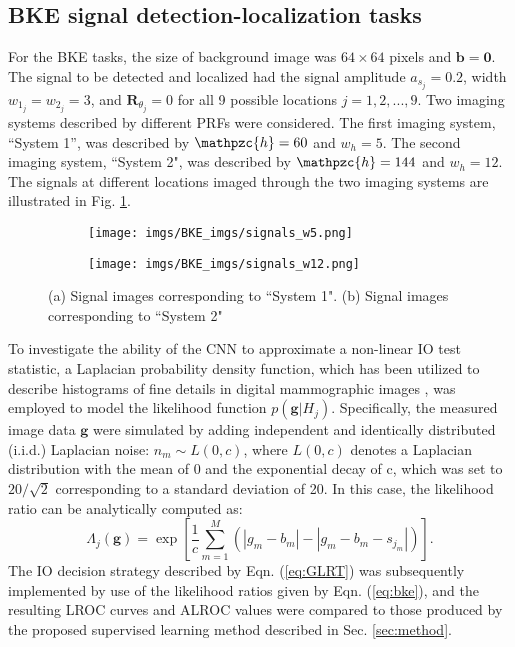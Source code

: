 \documentclass[journal]{IEEEtran}
\renewcommand{\vec}[1]{\mathbf{#1}}
\begin{document}
\subsection{BKE signal detection-localization tasks}
\vspace{0.05cm}
For the BKE tasks, the size of background image was $64\times 64$ pixels and $\vec{b} = \vec{0}$.
The signal to be detected and localized had the signal amplitude $a_{s_j} = 0.2$, width $w_{1_j} = w_{2_j} = 3$, and $\vec{R}_{\theta_j} = 0$ for all 9 possible locations $j=1,2,...,9$.
Two imaging systems described by different PRFs  were considered.
The first imaging system, ``System 1'', was described by $\mathpzc{h}=60$ and $w_h=5$.
The second imaging system, ``System 2", was described by $\mathpzc{h}=144$ and $w_h=12$.
The signals at different locations imaged through the two imaging systems are illustrated in Fig. \ref{sig_imgs}.
\begin{figure}[ht]
\centering
\begin{subfigure}[b]{0.24\textwidth}
   \centering
 \texttt{[image: imgs/BKE\_imgs/signals\_w5.png]}
 \caption{}
 \end{subfigure}
 \begin{subfigure}[b]{0.24\textwidth}
  \centering
 \texttt{[image: imgs/BKE\_imgs/signals\_w12.png]}
  \caption{}
 \end{subfigure}
 \caption{(a) Signal images corresponding to ``System 1".  (b) Signal images corresponding to ``System 2"}
 \label{sig_imgs}
\end{figure}

To investigate the ability of the CNN to approximate a non-linear IO test statistic,
a Laplacian probability density function,
which has been utilized  
to describe histograms of 
fine details in 
digital mammographic images \cite{heine1999multiresolution, clarkson2000approximations}, 
was employed to model the likelihood function $p(\vec{g}|H_j)$.
Specifically, the measured image data $\vec{g}$ were simulated by adding independent and identically distributed (i.i.d.) Laplacian noise\cite{clarkson2000approximations}:
$n_m\sim L(0,c)$, where $L(0,c)$ denotes a Laplacian distribution with the mean of 0 and the exponential decay of c, which was set to $20/\sqrt{2}$ corresponding to a standard deviation of 20.
In this case, the likelihood ratio can be analytically computed as\cite{clarkson2000approximations}:
\begin{equation}\label{eq:bke}
\Lambda_j(\vec{g}) = \exp\left[\frac{1}{c}\sum_{m=1}^{M} (|g_m - b_m| - |g_m-b_m-s_{j_m}|) \right].
\end{equation}
The IO decision strategy described by Eqn. (\ref{eq:GLRT}) was subsequently implemented by use of the likelihood ratios given by Eqn. (\ref{eq:bke}), and the resulting LROC curves and ALROC
values were compared to those produced by the proposed supervised learning method described in Sec. \ref{sec:method}.
\end{document}
